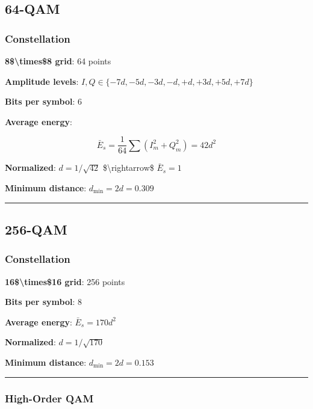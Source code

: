 \subsection{64-QAM}\label{qam-1}

\subsubsection{Constellation}\label{constellation-1}

\textbf{8\$\textbackslash times\$8 grid}: 64 points

\textbf{Amplitude levels}:
\(I, Q \in \{-7d, -5d, -3d, -d, +d, +3d, +5d, +7d\}\)

\textbf{Bits per symbol}: 6

\textbf{Average energy}:

\[
\bar{E}_s = \frac{1}{64}\sum (I_m^2 + Q_m^2) = 42d^2
\]

\textbf{Normalized}: \(d = 1/\sqrt{42}\) \$\textbackslash rightarrow\$
\(\bar{E}_s = 1\)

\textbf{Minimum distance}: \(d_{\min} = 2d = 0.309\)

\begin{center}\rule{0.5\linewidth}{0.5pt}\end{center}

\subsection{256-QAM}\label{qam-2}

\subsubsection{Constellation}\label{constellation-2}

\textbf{16\$\textbackslash times\$16 grid}: 256 points

\textbf{Bits per symbol}: 8

\textbf{Average energy}: \(\bar{E}_s = 170d^2\)

\textbf{Normalized}: \(d = 1/\sqrt{170}\)

\textbf{Minimum distance}: \(d_{\min} = 2d = 0.153\)

\begin{center}\rule{0.5\linewidth}{0.5pt}\end{center}

\subsubsection{High-Order QAM}\label{high-order-qam}


